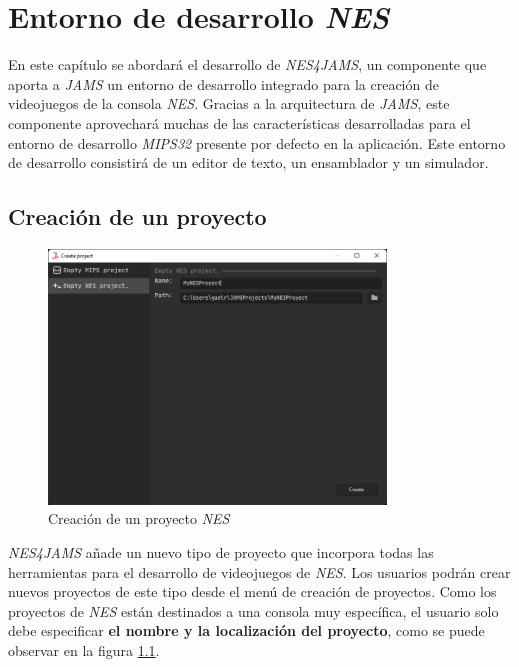 \chapter{Entorno de desarrollo \textit{NES}}\label{ch:entorno-de-desarrollo-nes}

En este capítulo se abordará el desarrollo de \textit{NES4JAMS},
un componente que aporta a \textit{JAMS} un entorno de desarrollo
integrado para la creación de videojuegos de la consola
\textit{NES}.
Gracias a la arquitectura de \textit{JAMS}, este componente
aprovechará muchas de las características desarrolladas
para el entorno de desarrollo \textit{MIPS32} presente
por defecto en la aplicación.
Este entorno de desarrollo consistirá de un editor
de texto, un ensamblador y un simulador.


\section{Creación de un proyecto}\label{sec:creacion-de-un-proyecto}

\begin{figure}[h]
    \centering
    \includegraphics[width=0.8\textwidth]{images/nes/nes-project-creation}
    \caption{Creación de un proyecto \textit{NES}}
    \label{fig:nes-project-creation}
\end{figure}

\textit{NES4JAMS} añade un nuevo tipo de proyecto
que incorpora todas las herramientas para el desarrollo
de videojuegos de \textit{NES}.
Los usuarios podrán crear nuevos proyectos de este tipo
desde el menú de creación de proyectos.
Como los proyectos de \textit{NES} están destinados
a una consola muy específica, el usuario solo debe
especificar \textbf{el nombre y la localización del proyecto},
como se puede observar en la figura \ref{fig:nes-project-creation}.

